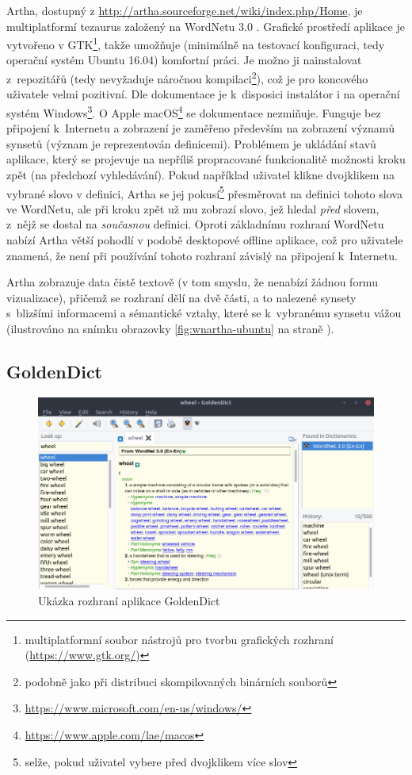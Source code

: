 \documentclass[a4paper, 11pt, oneside, showtrims]{book}
\begin{document}
				Artha, dostupný z \url{http://artha.sourceforge.net/wiki/index.php/Home}, je multiplatformí tezaurus založený na WordNetu 3.0 \parencite{ramaswamy2012}. Grafické prostředí aplikace je vytvořeno v GTK\footnote{multiplatformní soubor nástrojů pro tvorbu grafických rozhraní (\url{https://www.gtk.org/})}, takže umožňuje (minimálně na testovací konfiguraci, tedy operační systém Ubuntu 16.04) komfortní práci. Je možno ji nainstalovat z~repozitářů (tedy nevyžaduje náročnou kompilaci\footnote{podobně jako při distribuci skompilovaných binárních souborů}), což je pro koncového uživatele velmi pozitivní. Dle dokumentace je k~disposici instalátor i na operační systém Windows\footnote{\url{https://www.microsoft.com/en-us/windows/}}. O Apple macOS\footnote{\url{https://www.apple.com/lae/macos}} se dokumentace nezmiňuje. Funguje bez připojení k~Internetu a zobrazení je zaměřeno především na zobrazení významů synsetů (význam je reprezentován definicemi). Problémem je ukládání stavů aplikace, který se projevuje na nepříliš propracované funkcionalitě možnosti kroku zpět (na předchozí vyhledávání). Pokud například uživatel klikne dvojklikem na vybrané slovo v definici, Artha se jej pokusí\footnote{selže, pokud uživatel vybere před dvojklikem více slov} přesměrovat na definici tohoto slova ve WordNetu, ale při kroku zpět už mu zobrazí slovo, jež hledal \textit{před} slovem, z~nějž se dostal na \textit{současnou} definici. Oproti základnímu rozhraní WordNetu nabízí Artha větší pohodlí v podobě desktopové offline aplikace, což pro uživatele znamená, že není při používání tohoto rozhraní závislý na připojení k~Internetu.

				Artha zobrazuje data čistě textově (v tom smyslu, že nenabízí žádnou formu vizualizace), přičemž se rozhraní dělí na dvě části, a to nalezené synsety s~blizšími informacemi a sémantické vztahy, které se k~vybranému synsetu vážou (ilustrováno na snímku obrazovky \ref{fig:wnartha-ubuntu} na straně \pageref{fig:wnartha-ubuntu}). 

			\subsection{GoldenDict}
 		
 				\begin{figure}[h]
					\centering
					\includegraphics[width=1.0\textwidth]{wngoldendick-ubuntu.png}
					\caption{Ukázka rozhraní aplikace GoldenDict}
					\label{fig:wngoldendick-ubuntu}
				\end{figure}
\end{document}
